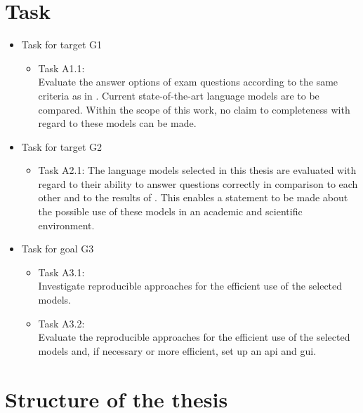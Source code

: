 \section{Task}
\begin{itemize}
  \item Task for target G1
        \begin{itemize}
          \item Task A1.1:\\Evaluate the answer options of exam questions according to the same criteria as in \citet{Paul_Keller}.
          Current state-of-the-art language models are to be compared. Within the scope of this work, no claim to completeness with regard to these models can be made. 
          \end{itemize}
 \item Task for target G2
    \begin{itemize}
          \item Task A2.1: The language models selected in this thesis are evaluated with regard to their ability to answer questions correctly in comparison to each other and to the results of \citet{Paul_Keller}.\@
          This enables a statement to be made about the possible use of these models in an academic and scientific environment.
        \end{itemize}
  \item Task for goal G3
        \begin{itemize}
          \item Task A3.1:\\Investigate reproducible approaches for the efficient use of the selected models.
          \item Task A3.2:\\Evaluate the reproducible approaches for the efficient use of the selected models and, if necessary or more efficient, set up an \ac{api} and \ac{gui}.
        \end{itemize}
\end{itemize}



\section{Structure of the thesis}
